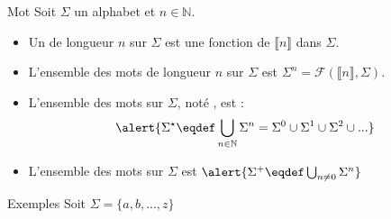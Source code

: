 
\begingroup

\begin{frame}{Mot}
  \small
  Soit $\Sigma$ un alphabet et $n\in \mathbb{N}$.
  \begin{itemize}
  \item Un  de longueur $n$ sur $\Sigma$ est une \alert{fonction de $\llbracket n\rrbracket$ dans $\Sigma$}.
  \item L'ensemble des mots de longueur $n$ sur $\Sigma$ est \alert{$\Sigma^n = \mathscr{F}(\llbracket n\rrbracket, \Sigma)$}.
  \item L'ensemble des mots sur $\Sigma$, noté \structure{$\Sigma^\star$}, est :
    $$\alert{\displaystyle \Sigma^\star \eqdef \bigcup_{n\in \mathbb{N}} \Sigma^n = \Sigma^0 \cup \Sigma^1 \cup \Sigma^2 \cup ...}$$
  \item L'ensemble des mots  sur $\Sigma$ est
    $\alert{\Sigma^+ \eqdef \bigcup_{n \neq 0 } \Sigma^n}$
  \end{itemize}

  \begin{exampleblock}{Exemples}
    Soit $\Sigma = \{a, b, ..., z\}$


\end{exampleblock}
\end{frame}
